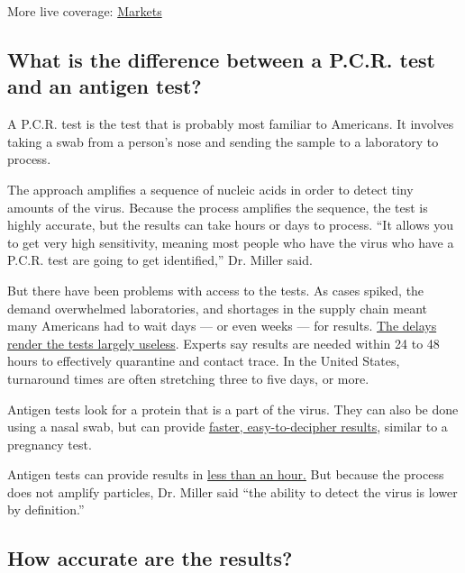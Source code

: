 More live coverage:
\href{https://www.nytimes3xbfgragh.onion/live/2020/09/09/business/stock-market-today-coronavirus?action=click\&pgtype=Article\&state=default\&region=MAIN_CONTENT_1\&context=storylines_live_updates}{Markets}

\hypertarget{what-is-the-difference-between-a-pcr-test-and-an-antigen-test}{%
\subsection{What is the difference between a P.C.R. test and an antigen
test?}\label{what-is-the-difference-between-a-pcr-test-and-an-antigen-test}}

A P.C.R. test is the test that is probably most familiar to Americans.
It involves taking a swab from a person's nose and sending the sample to
a laboratory to process.

The approach amplifies a sequence of nucleic acids in order to detect
tiny amounts of the virus. Because the process amplifies the sequence,
the test is highly accurate, but the results can take hours or days to
process. ``It allows you to get very high sensitivity, meaning most
people who have the virus who have a P.C.R. test are going to get
identified,'' Dr. Miller said.

But there have been problems with access to the tests. As cases spiked,
the demand overwhelmed laboratories, and shortages in the supply chain
meant many Americans had to wait days --- or even weeks --- for results.
\href{https://www.nytimes3xbfgragh.onion/2020/08/04/us/virus-testing-delays.html}{The
delays render the tests largely useless}. Experts say results are needed
within 24 to 48 hours to effectively quarantine and contact trace. In
the United States, turnaround times are often stretching three to five
days, or more.

Antigen tests look for a protein that is a part of the virus. They can
also be done using a nasal swab, but can provide
\href{https://www.bd.com/en-us/offerings/capabilities/microbiology-solutions/point-of-care-testing/bd-veritor-sars-cov-2}{faster,
easy-to-decipher results}, similar to a pregnancy test.

Antigen tests can provide results in
\href{https://www.nytimes3xbfgragh.onion/2020/07/06/health/fast-coronavirus-tests.html}{less
than an hour.} But because the process does not amplify particles, Dr.
Miller said ``the ability to detect the virus is lower by definition.''

\hypertarget{how-accurate-are-the-results}{%
\subsection{How accurate are the
results?}\label{how-accurate-are-the-results}}

